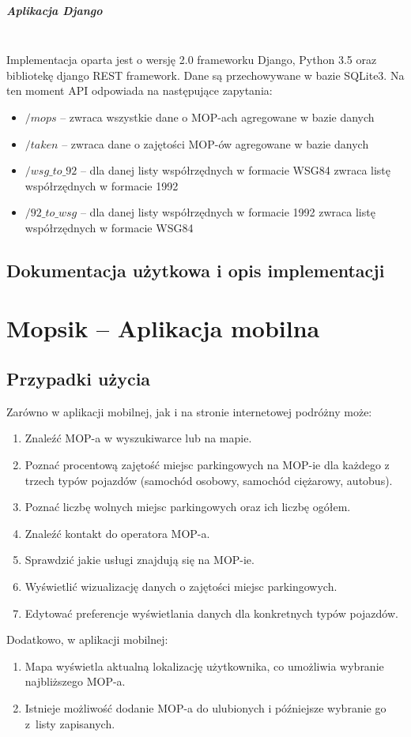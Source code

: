\paragraph{Aplikacja Django}\mbox{}\\
Implementacja oparta jest o wersję 2.0 frameworku Django, Python 3.5 oraz bibliotekę django REST framework. Dane są przechowywane w bazie SQLite3. Na ten moment API odpowiada na następujące zapytania:
\begin{itemize}
\item $/mops$ -- zwraca wszystkie dane o MOP-ach agregowane w bazie danych
\item $/taken$ -- zwraca dane o zajętości MOP-ów agregowane w bazie danych
\item $/wsg\_to\_92$ -- dla danej listy współrzędnych w formacie WSG84 zwraca listę współrzędnych w formacie 1992
\item $/92\_to\_wsg$ -- dla danej listy współrzędnych w formacie 1992 zwraca listę współrzędnych w formacie WSG84
\end{itemize}

\section{Dokumentacja użytkowa i opis implementacji}

\chapter{Mopsik -- Aplikacja mobilna}

\section{Przypadki użycia}
Zarówno w aplikacji mobilnej, jak i na stronie internetowej podróżny może:
\begin{enumerate}
\item Znaleźć MOP-a w wyszukiwarce lub na mapie.
\item Poznać procentową zajętość miejsc parkingowych na MOP-ie dla każdego z trzech typów pojazdów (samochód osobowy, samochód ciężarowy, autobus).
\item Poznać liczbę wolnych miejsc parkingowych oraz ich liczbę ogółem.
\item Znaleźć kontakt do operatora MOP-a.
\item Sprawdzić jakie usługi znajdują się na MOP-ie.
\item Wyświetlić wizualizację danych o zajętości miejsc parkingowych.
\item Edytować preferencje wyświetlania danych dla konkretnych typów pojazdów.
\end{enumerate}
Dodatkowo, w aplikacji mobilnej:
\begin{enumerate}
\item Mapa wyświetla aktualną lokalizację użytkownika, co umożliwia wybranie najbliższego MOP-a. 
\item Istnieje możliwość dodanie MOP-a do ulubionych i późniejsze wybranie go z~listy zapisanych.
\end{enumerate}


